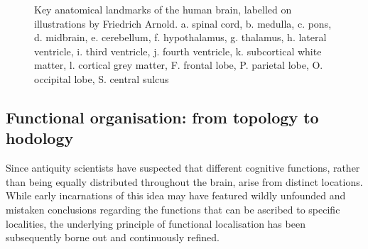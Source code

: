 %   
\begin{figure}[h!]
  \begin{subfigure}[b]{0.5\textwidth}
    
    \caption{}\label{fig:ardnoldVII1}
  \end{subfigure}%
  \begin{subfigure}[b]{0.5\textwidth}
    
    \caption{}\label{fig:ardnoldX4}
  \end{subfigure}
  \caption{Key anatomical landmarks of the human brain, labelled on illustrations by Friedrich Arnold\autocite{Arnold1838}. a. spinal cord, b. medulla, c. pons, d. midbrain, e. cerebellum, f. hypothalamus, g. thalamus, h. lateral ventricle, i. third ventricle, j. fourth ventricle, k. subcortical white matter, l. cortical grey matter, F. frontal lobe, P. parietal lobe, O. occipital lobe, S. central sulcus}
  \label{fig:anat2}
\end{figure}


\subsection{Functional organisation: from topology to hodology}\label{sec:hodology}

Since antiquity scientists have suspected that different cognitive functions, rather than being equally distributed throughout the brain, arise from distinct locations.
While early incarnations of this idea may have featured wildly unfounded and mistaken conclusions regarding the functions that can be ascribed to specific localities, the underlying principle of functional localisation has been subsequently borne out and continuously refined.

